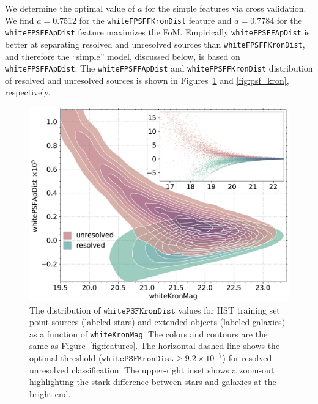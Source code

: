 \documentclass[twocolumn]{aastex63}
\begin{document}
We determine the optimal value of $a$ for the simple features via cross
validation. We find $a = 0.7512$ for the \texttt{whiteFPSFFKronDist} feature
and $a = 0.7784$ for the \texttt{whiteFPSFFApDist} feature maximizes the FoM.
Empirically \texttt{whiteFPSFFApDist} is better at separating resolved and
unresolved sources than \texttt{whiteFPSFFKronDist}, and therefore the
``simple'' model, discussed below, is based on \texttt{whiteFPSFFApDist}. The
\texttt{whiteFPSFFApDist} and \texttt{whiteFPSFFKronDist} distribution of
resolved and unresolved sources is shown in Figures~\ref{fig:psf_ap} and
\ref{fig:psf_kron}, respectively.

\begin{figure}
    \centering
    \includegraphics[width=\columnwidth]{./figures/whiteFPSFApDist.pdf}
    \caption{The distribution of $\mathtt{whitePSFKronDist}$ values for HST
    training set point sources (labeled stars) and extended objects (labeled
    galaxies) as a function of \texttt{whiteKronMag}. The colors and contours
    are the same as Figure~\ref{fig:features}. The horizontal dashed line
    shows the optimal threshold ($\mathtt{whitePSFKronDist} \ge 9.2 \times
    10^{-7}$) for resolved--unresolved classification. The upper-right inset
    shows a zoom-out highlighting the stark difference between stars and
    galaxies at the bright end.}
    \label{fig:psf_ap}
\end{figure}
\end{document}

